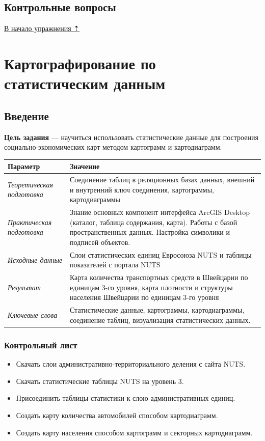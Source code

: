 \documentclass[]{book}
\providecommand{\tightlist}{%
  \setlength{\itemsep}{0pt}\setlength{\parskip}{0pt}}
\theoremstyle{definition}
\theoremstyle{definition}
\theoremstyle{definition}
\theoremstyle{remark}
\begin{document}
\hypertarget{map-ref-general-questions}{%
\section{Контрольные вопросы}\label{map-ref-general-questions}}

\protect\hyperlink{map-ref-general}{В начало упражнения ⇡}

\hypertarget{stat-map-economic}{%
\chapter{Картографирование по статистическим
данным}\label{stat-map-economic}}

\hypertarget{stat-map-economic-intro}{%
\section{Введение}\label{stat-map-economic-intro}}

\textbf{Цель задания} --- научиться использовать статистические данные
для построения социально-экономических карт методом картограмм и
картодиаграмм.

\begin{longtable}[]{@{}ll@{}}
\toprule
Параметр & Значение\tabularnewline
\midrule
\endhead
\emph{Теоретическая подготовка} & Соединение таблиц в реляционных базах
данных, внешний и внутренний ключ соединения, картограммы,
картодиаграммы\tabularnewline
\emph{Практическая подготовка} & Знание основных компонент интерфейса
ArcGIS Desktop (каталог, таблица содержания, карта). Работы с базой
пространственных данных. Настройка символики и подписей
объектов.\tabularnewline
\emph{Исходные данные} & Слои статистических единиц Евросоюза NUTS и
таблицы показателей с портала NUTS\tabularnewline
\emph{Результат} & Карта количества транспортных средств в Швейцарии по
единицам 3-го уровня, карта плотности и структуры населения Швейцарии по
единицам 3-го уровня\tabularnewline
\emph{Ключевые слова} & Статистические данные, картограммы,
картодиаграммы, соединение таблиц, визуализация статистических
данных.\tabularnewline
\bottomrule
\end{longtable}

\hypertarget{stat-map-economic-control}{%
\subsection{Контрольный лист}\label{stat-map-economic-control}}

\begin{itemize}
\tightlist
\item
  Скачать слои административно-территориального деления с сайта NUTS.
\item
  Скачать статистические таблицы NUTS на уровень 3.
\item
  Присоединить таблицы статистики к слою административных единиц.
\item
  Создать карту количества автомобилей способом картодиаграмм.
\item
  Создать карту населения способом картограмм и секторных картодиаграмм.
\end{itemize}
\end{document}

